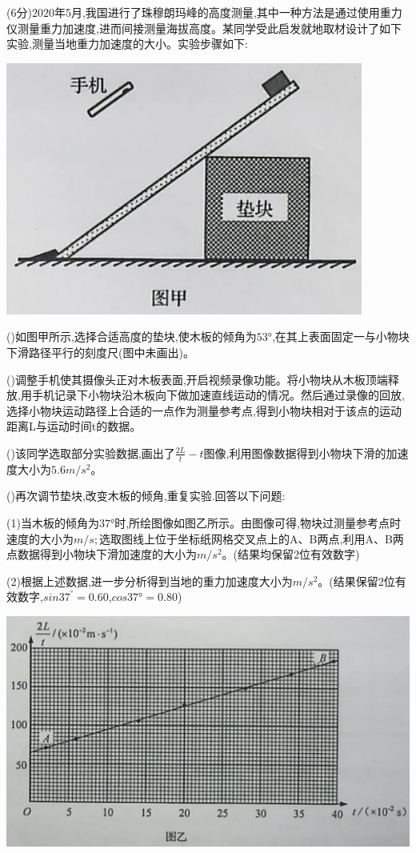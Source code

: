\question[6] (6分)$2020$年5月,我国进行了珠穆朗玛峰的高度测量,其中一种方法是通过使用重力仪测量重力加速度,进而间接测量海拔高度。某同学受此启发就地取材设计了如下实验,测量当地重力加速度的大小。实验步骤如下:
\begin{center}
    \includegraphics[]{img/image21.png}
\end{center}
()如图甲所示,选择合适高度的垫块,使木板的倾角为$53°$,在其上表面固定一与小物块下滑路径平行的刻度尺(图中未画出)。

()调整手机使其摄像头正对木板表面,开启视频录像功能。将小物块从木板顶端释放,用手机记录下小物块沿木板向下做加速直线运动的情况。然后通过录像的回放,选择小物块运动路径上合适的一点作为测量参考点,得到小物块相对于该点的运动距离L与运动时间t的数据。

()该同学选取部分实验数据,画出了$\frac{2L}{t}-t$图像,利用图像数据得到小物块下滑的加速度大小为$5.6m/s^2$。

()再次调节垫块,改变木板的倾角,重复实验.回答以下问题:

(1)当木板的倾角为$37°$时,所绘图像如图乙所示。由图像可得,物块过测量参考点时速度的大小为$m/s;$选取图线上位于坐标纸网格交叉点上的A、B两点,利用A、B两点数据得到小物块下滑加速度的大小为$m/s^2$。(结果均保留2位有效数字)

(2)根据上述数据,进一步分析得到当地的重力加速度大小为$m/s^2$。(结果保留2位有效数字,$sin37^°=0.60$,$cos37°=0.80$)\begin{center}\includegraphics[]{img/image11.png}\end{center}



